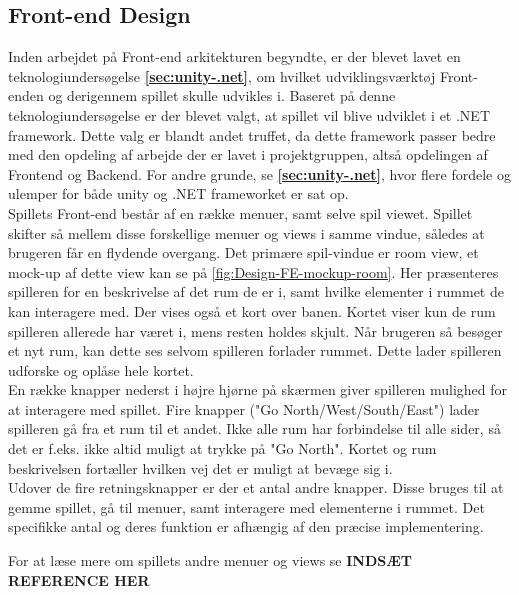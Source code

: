\subsection{Front-end Design}
\label{ssec:FE Design}

Inden arbejdet på Front-end arkitekturen begyndte, er der blevet lavet en teknologiundersøgelse \textbf{\autoref{sec:unity-.net}}, om hvilket udviklingsværktøj Front-enden og derigennem spillet skulle udvikles i. Baseret på denne teknologiundersøgelse er der blevet valgt, at spillet vil blive udviklet i et .NET framework. Dette valg er blandt andet truffet, da dette framework passer bedre med den opdeling af arbejde der er lavet i projektgruppen, altså opdelingen af Frontend og Backend. For andre grunde, se \textbf{\autoref{sec:unity-.net}}, hvor flere fordele og ulemper for både unity og .NET frameworket er sat op.\\

Spillets Front-end består af en række menuer, samt selve spil viewet. Spillet skifter så mellem disse forskellige menuer og views i samme vindue, således at brugeren får en flydende overgang.
Det primære spil-vindue er room view, et mock-up af dette view kan se på \autoref{fig:Design-FE-mockup-room}. Her præsenteres spilleren for en beskrivelse af det rum de er i, samt hvilke elementer i rummet de kan interagere med. Der vises også et kort over banen. Kortet viser kun de rum spilleren allerede har været i, mens resten holdes skjult. Når brugeren så besøger et nyt rum, kan dette ses selvom spilleren forlader rummet. Dette lader spilleren udforske og oplåse hele kortet.\\
En række knapper nederst i højre hjørne på skærmen giver spilleren mulighed for at interagere med spillet. Fire knapper ("Go {North/West/South/East}") lader spilleren gå fra et rum til et andet. Ikke alle rum har forbindelse til alle sider, så det er f.eks. ikke altid muligt at trykke på "Go North". Kortet og rum beskrivelsen fortæller hvilken vej det er muligt at bevæge sig i.\\
Udover de fire retningsknapper er der et antal andre knapper. Disse bruges til at gemme spillet, gå til menuer, samt interagere med elementerne i rummet. Det specifikke antal og deres funktion er afhængig af den præcise implementering.

For at læse mere om spillets andre menuer og views se \textbf{INDSÆT REFERENCE HER}


